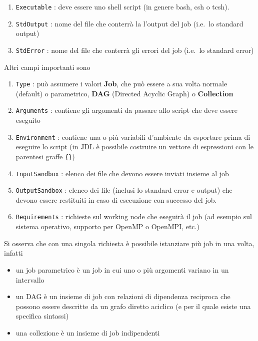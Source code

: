 \documentclass[italian,]{article}
\providecommand{\tightlist}{%
  \setlength{\itemsep}{0pt}\setlength{\parskip}{0pt}}
\begin{document}
\begin{enumerate}
\def\labelenumi{\arabic{enumi}.}
\tightlist
\item
  \texttt{Executable} : deve essere uno shell script (in genere bash,
  csh o tcsh).
\item
  \texttt{StdOutput} : nome del file che conterrà la l'output del job
  (i.e.~lo standard output)
\item
  \texttt{StdError} : nome del file che conterrà gli errori del job
  (i.e.~lo standard error)
\end{enumerate}

Altri campi importanti sono

\begin{enumerate}
\def\labelenumi{\arabic{enumi}.}
\tightlist
\item
  \texttt{Type} : può assumere i valori \textbf{Job}, che può essere a
  sua volta normale (default) o parametrico, \textbf{DAG} (Directed
  Acyclic Graph) o \textbf{Collection}
\item
  \texttt{Arguments} : contiene gli argomenti da passare allo script che
  deve essere eseguito
\item
  \texttt{Environment} : contiene una o più variabili d'ambiente da
  esportare prima di eseguire lo script (in JDL è possibile costruire un
  vettore di espressioni con le parentesi graffe \texttt{\{\}})
\item
  \texttt{InputSandbox} : elenco dei file che devono essere inviati
  insieme al job
\item
  \texttt{OutputSandbox} : elenco dei file (inclusi lo standard error e
  output) che devono essere restituiti in caso di esecuzione con
  successo del job.
\item
  \texttt{Requirements} : richieste sul working node che eseguirà il job
  (ad esempio sul sistema operativo, supporto per OpenMP o OpenMPI,
  etc.)
\end{enumerate}

Si osserva che con una singola richiesta è possibile istanziare più job
in una volta, infatti

\begin{itemize}
\tightlist
\item
  un job parametrico è un job in cui uno o più argomenti variano in un
  intervallo
\item
  un DAG è un insieme di job con relazioni di dipendenza reciproca che
  possono essere descritte da un grafo diretto aciclico (e per il quale
  esiste una specifica sintassi)
\item
  una collezione è un insieme di job indipendenti
\end{itemize}
\end{document}
